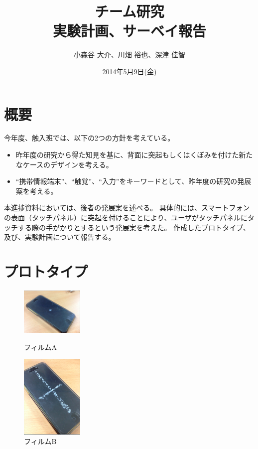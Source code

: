 \documentclass[11pt,a4paper]{jarticle}
\title{{チーム研究\\実験計画、サーベイ報告}}
\date{2014年5月9日(金)}
\author{小森谷 大介、川畑 裕也、深津 佳智}
\begin{document}
\maketitle

\section{概要}
今年度、触入班では、以下の2つの方針を考えている。
\begin{itemize}
	\item 昨年度の研究から得た知見を基に、背面に突起もしくはくぼみを付けた新たなケースのデザインを考える。
	\item ``携帯情報端末''、``触覚''、``入力''をキーワードとして、昨年度の研究の発展案を考える。
\end{itemize}
本進捗資料においては、後者の発展案を述べる。
具体的には、スマートフォンの表面（タッチパネル）に突起を付けることにより、ユーザがタッチパネルにタッチする際の手がかりとするという発展案を考えた。
作成したプロトタイプ、及び、実験計画について報告する。

\section{プロトタイプ}


\begin{figure}[H]
\begin{minipage}{0.5\hsize}
  \includegraphics[width=3cm]{fig/figure4.eps}
  \caption{フィルムA}
\end{minipage}
\begin{minipage}{0.5\hsize}
  \includegraphics[width=3cm]{fig/figure5.eps}
  \caption{フィルムB}
\end{minipage}
\end{figure}
\end{document}
